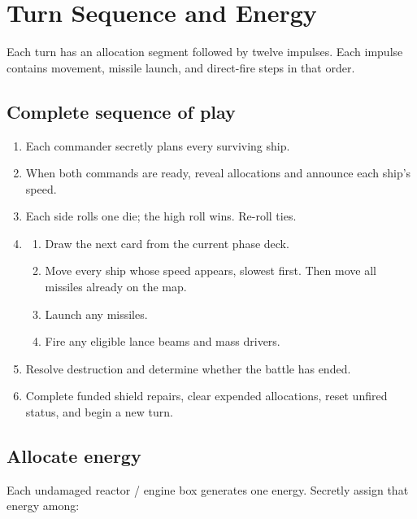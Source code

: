 \chapter{Turn Sequence and Energy}

Each turn has an allocation segment followed by twelve impulses. Each impulse contains movement, missile launch, and direct-fire steps in that order.

\section{Complete sequence of play}

\begin{enumerate}
  \item {} Each commander secretly plans every surviving ship.
  \item {} When both commands are ready, reveal allocations and announce each ship's speed.
  \item {} Each side rolls one die; the high roll wins. Re-roll ties.
  \item {}
  \begin{enumerate}[label=\alph*.]
    \item Draw the next card from the current phase deck.
    \item Move every ship whose speed appears, slowest first. Then move all missiles already on the map.
    \item Launch any missiles.
    \item Fire any eligible lance beams and mass drivers.
  \end{enumerate}
  \item {} Resolve destruction and determine whether the battle has ended.
  \item {} Complete funded shield repairs, clear expended allocations, reset unfired status, and begin a new turn.
\end{enumerate}

\section{Allocate energy}

Each undamaged reactor / engine box generates one energy. Secretly assign that energy among:

